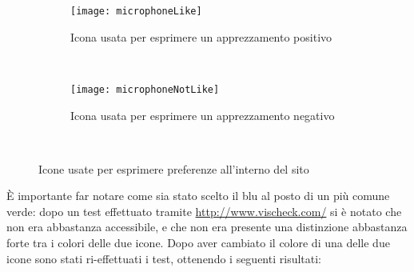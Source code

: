 \begin{figure}[H]
    \centering
    \begin{subfigure}[b]{0.4\textwidth}
        \texttt{[image: microphoneLike]}
        \caption{Icona usata per esprimere un apprezzamento positivo}
    \end{subfigure}
    ~
    \begin{subfigure}[b]{0.4\textwidth}
        \texttt{[image: microphoneNotLike]}
        \caption{Icona usata per esprimere un apprezzamento negativo}
    \end{subfigure}
    ~
    \caption{Icone usate per esprimere preferenze all'interno del sito}
\end{figure}

\`E importante far notare come sia stato scelto il blu al posto di un pi\`u comune verde: dopo un test effettuato tramite \url{http://www.vischeck.com/} si \`e notato che non era abbastanza accessibile, e che non era presente una distinzione abbastanza forte tra i colori delle due icone. Dopo aver cambiato il colore di una delle due icone sono stati ri-effettuati i test, ottenendo i seguenti risultati:
